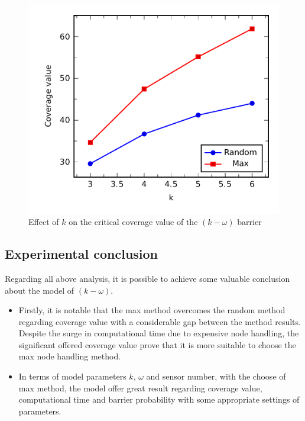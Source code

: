 \begin{figure}[!h]
	\centering
	\includegraphics[scale=1.]{Hinhanh/kEffect/main.pdf}
	\caption{Effect of $k$ on the critical coverage value of the $(k-\omega)$ barrier}
	\label{fig:k}
\end{figure}

\subsection{Experimental conclusion}
Regarding all above analysis, it is possible to achieve some valuable conclusion about the model of $(k-\omega)$.
\begin{itemize}
	\item Firstly, it is notable that the max method overcomes the random method regarding coverage value with a considerable gap between the method results. Despite the surge in computational time due to expensive node handling, the significant offered coverage value prove that it is more suitable to choose the max node handling method.
	\item In terms of model parameters $k$, $\omega$ and sensor number, with the choose of max method, the model offer great result regarding coverage value, computational time and barrier probability with some appropriate settings of parameters.
\end{itemize}